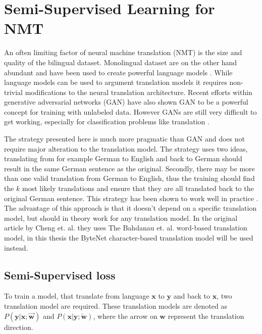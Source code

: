 \section{Semi-Supervised Learning for NMT}
\label{sec:theory:semi-supervised}

An often limiting factor of neural machine translation (NMT) is the size and quality of the bilingual dataset. Monolingual dataset are on the other hand abundant and have been used to create powerful language models \cite{word2vec}. While language models can be used to argument translation models it requires non-trivial modifications to the neural translation architecture. Recent efforts within generative adversarial networks (GAN) \cite{gan-image-translation} have also shown GAN to be a powerful concept for training with unlabeled data. However GANs are still very difficult to get working, especially for classification problems like translation \cite{gan-on-nlp}.

The strategy presented here is much more pragmatic than GAN and does not require major alteration to the translation model. The strategy uses two ideas, translating from for example German to English and back to German should result in the same German sentence as the original. Secondly, there may be more than one valid translation from German to English, thus the training should find the $k$ most likely translations and ensure that they are all translated back to the original German sentence. This strategy has been shown to work well in practice \cite{semi-supervised}. The advantage of this approach is that it doesn't depend on a specific translation model, but should in theory work for any translation model. In the original article by Cheng et. al. \cite{semi-supervised} they uses The Bahdanau et. al. \cite{bahdanau-2015-nmt} word-based translation model, in this thesis the ByteNet \cite{bytenet} character-based translation model will be used instead.

\subsection{Semi-Supervised loss}

To train a model, that translate from language $\mathbf{x}$ to $\mathbf{y}$ and back to $\mathbf{x}$, two translation model are required. These translation models are denoted as $P(\mathbf{y}|\mathbf{x};\overrightarrow{\mathbf{w}})$ and $P(\mathbf{x}|\mathbf{y};\overleftarrow{\mathbf{w}})$, where the arrow on ${\mathbf{w}}$ represent the translation direction.

